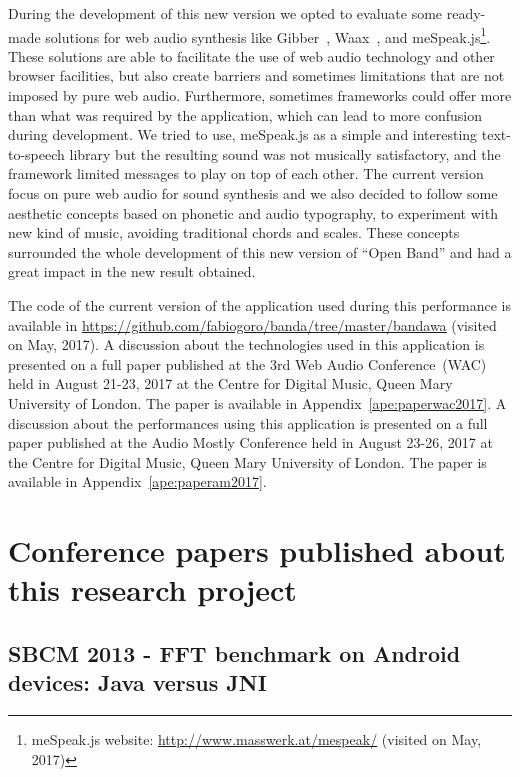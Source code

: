 During the development of this new version we opted to evaluate some ready-made solutions for web audio synthesis like Gibber~\citep{Roberts2012gibberlivecoding}, Waax~\citep{Choi2013waax}, and meSpeak.js\footnote{meSpeak.js website: \url{http://www.masswerk.at/mespeak/} (visited on May, 2017)}.
These solutions are able to facilitate the use of web audio technology and other browser facilities, but also create barriers and sometimes limitations that are not imposed by pure web audio.
Furthermore, sometimes frameworks could offer more than what was required by the application, which can lead to more confusion during development. 
We tried to use, meSpeak.js as a simple and interesting text-to-speech library but the resulting sound was not musically satisfactory, and the framework limited messages to play on top of each other.
The current version focus on pure web audio for sound synthesis and we also decided to follow some aesthetic concepts based on phonetic and audio typography, to experiment with new kind of music, avoiding traditional chords and scales. 
These concepts surrounded the whole development of this new version of ``Open Band'' and had a great impact in the new result obtained.

The code of the current version of the application used during this performance is available in \url{https://github.com/fabiogoro/banda/tree/master/bandawa} (visited on May, 2017).
A discussion about the technologies used in this application is presented on a full paper published at the 3rd Web Audio Conference~(WAC) held in August 21-23, 2017 at the Centre for Digital Music, Queen Mary University of London.
The paper is available in Appendix~\ref{ape:paperwac2017}.
A discussion about the performances using this application is presented on a full paper published at the Audio Mostly Conference held in August 23-26, 2017 at the Centre for Digital Music, Queen Mary University of London.
The paper is available in Appendix~\ref{ape:paperam2017}.

\chapter{Conference papers published about this research project}
\label{ape:papers}

\section{SBCM 2013 - FFT benchmark on Android devices: Java versus JNI}
\label{ape:papersbcm2013}

